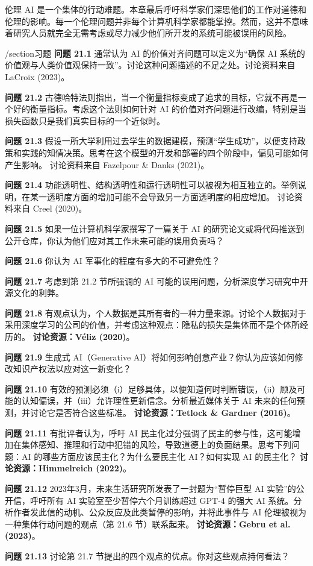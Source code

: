 \documentclass[lang=cn,newtx,10pt,scheme=chinese]{elegantbook}
\begin{document}
伦理 AI 是一个集体的行动难题。本章最后呼吁科学家们深思他们的工作对道德和伦理的影响。每一个伦理问题并非每个计算机科学家都能掌控。然而，这并不意味着研究人员就完全无需考虑或尽力减少他们所开发的系统可能被误用的风险。

/section{习题}
\textbf{问题 21.1} 通常认为 AI 的价值对齐问题可以定义为“确保 AI 系统的价值观与人类价值观保持一致”。讨论这种问题描述的不足之处。讨论资料来自 LaCroix (2023)。

\textbf{问题 21.2} 古德哈特法则指出，当一个衡量指标变成了追求的目标，它就不再是一个好的衡量指标。考虑这个法则如何针对 AI 的价值对齐问题进行改编，特别是当损失函数只是我们真实目标的一个近似时。

\textbf{问题 21.3} 假设一所大学利用过去学生的数据建模，预测“学生成功”，以便支持政策和实践的知情决策。思考在这个模型的开发和部署的四个阶段中，偏见可能如何产生影响。 讨论资料来自 Fazelpour \& Danks (2021)。

\textbf{问题 21.4} 功能透明性、结构透明性和运行透明性可以被视为相互独立的。举例说明，在某一透明度方面的增加可能不会导致另一方面透明度的相应增加。 讨论资料来自 Creel (2020)。

\textbf{问题 21.5} 如果一位计算机科学家撰写了一篇关于 AI 的研究论文或将代码推送到公开仓库，你认为他们应对其工作未来可能的误用负责吗？

\textbf{问题 21.6} 你认为 AI 军事化的程度有多大的不可避免性？

\textbf{问题 21.7} 考虑到第 21.2 节所强调的 AI 可能的误用问题，分析深度学习研究中开源文化的利弊。

\textbf{问题 21.8} 有观点认为，个人数据是其所有者的一种力量来源。讨论个人数据对于采用深度学习的公司的价值，并考虑这种观点：隐私的损失是集体而不是个体所经历的。
\textbf{讨论资源：Véliz (2020)}。

\textbf{问题 21.9} 生成式 AI（Generative AI）将如何影响创意产业？你认为应该如何修改知识产权法以应对这一新变化？

\textbf{问题 21.10} 有效的预测必须（i）足够具体，以便知道何时判断错误，（ii）顾及可能的认知偏误，并（iii）允许理性更新信念。分析最近媒体关于 AI 未来的任何预测，并讨论它是否符合这些标准。
\textbf{讨论资源：Tetlock \& Gardner (2016)}。

\textbf{问题 21.11} 有批评者认为，呼吁 AI 民主化过分强调了民主的参与性，这可能增加在集体感知、推理和行动中犯错的风险，导致道德上的负面结果。思考下列问题：AI 的哪些方面应该民主化？为什么要民主化 AI？如何实现 AI 的民主化？
\textbf{讨论资源：Himmelreich (2022)}。

\textbf{问题 21.12} 2023年3月，未来生活研究所发表了一封题为“暂停巨型 AI 实验”的公开信，呼吁所有 AI 实验室至少暂停六个月训练超过 GPT-4 的强大 AI 系统。分析作者发此信的动机、公众反应及此类暂停的影响，并将此事件与 AI 伦理被视为一种集体行动问题的观点（第 21.6 节）联系起来。
\textbf{讨论资源：Gebru et al. (2023)}。

\textbf{问题 21.13} 讨论第 21.7 节提出的四个观点的优点。你对这些观点持何看法？
\end{document}

